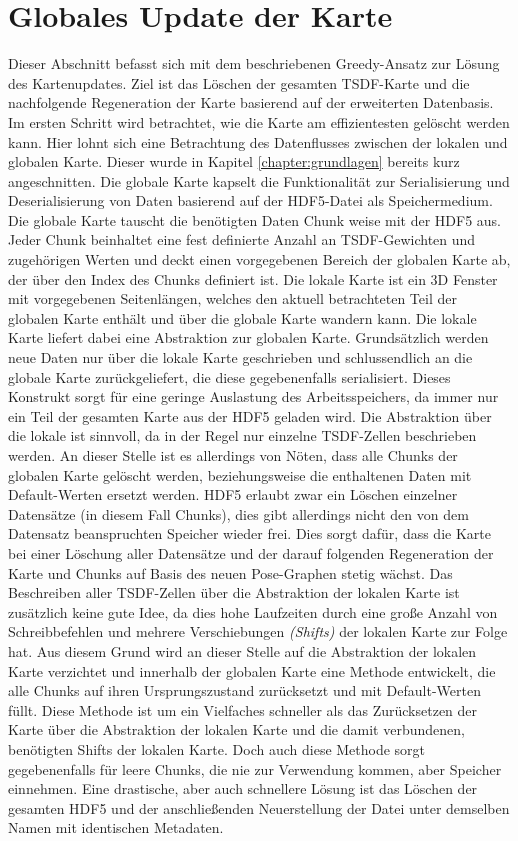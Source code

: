 \section{Globales Update der Karte}
\label{section:global_update}

Dieser Abschnitt befasst sich mit dem beschriebenen Greedy-Ansatz zur Lösung des Kartenupdates. Ziel ist das Löschen der gesamten TSDF-Karte und die nachfolgende Regeneration der Karte basierend auf der erweiterten Datenbasis. Im ersten Schritt wird betrachtet, wie die Karte am effizientesten gelöscht werden kann. Hier lohnt sich eine Betrachtung des Datenflusses zwischen der lokalen und globalen Karte. Dieser wurde in Kapitel \ref{chapter:grundlagen} bereits kurz angeschnitten. Die globale Karte kapselt die Funktionalität zur Serialisierung und Deserialisierung von Daten basierend auf der HDF5-Datei als Speichermedium. Die globale Karte tauscht die benötigten Daten Chunk weise mit der HDF5 aus. Jeder Chunk beinhaltet eine fest definierte Anzahl an TSDF-Gewichten und zugehörigen Werten und deckt einen vorgegebenen Bereich der globalen Karte ab, der über den Index des Chunks definiert ist. Die lokale Karte ist ein 3D Fenster mit vorgegebenen Seitenlängen, welches den aktuell betrachteten Teil der globalen Karte enthält und über die globale Karte wandern kann. Die lokale Karte liefert dabei eine Abstraktion zur globalen Karte. Grundsätzlich werden neue Daten nur über die lokale Karte geschrieben und schlussendlich an die globale Karte zurückgeliefert, die diese gegebenenfalls serialisiert. Dieses Konstrukt sorgt für eine geringe Auslastung des Arbeitsspeichers, da immer nur ein Teil der gesamten Karte aus der HDF5 geladen wird. Die Abstraktion über die lokale ist sinnvoll, da in der Regel nur einzelne TSDF-Zellen beschrieben werden. An dieser Stelle ist es allerdings von Nöten, dass alle Chunks der globalen Karte gelöscht werden, beziehungsweise die enthaltenen Daten mit Default-Werten ersetzt werden. HDF5 erlaubt zwar ein Löschen einzelner Datensätze (in diesem Fall Chunks), dies gibt allerdings nicht den von dem Datensatz beanspruchten Speicher wieder frei. Dies sorgt dafür, dass die Karte bei einer Löschung aller Datensätze und der darauf folgenden Regeneration der Karte und Chunks auf Basis des neuen Pose-Graphen stetig wächst. Das Beschreiben aller TSDF-Zellen über die Abstraktion der lokalen Karte ist zusätzlich keine gute Idee, da dies hohe Laufzeiten durch eine große Anzahl von Schreibbefehlen und mehrere Verschiebungen \emph{(Shifts)} der lokalen Karte zur Folge hat. Aus diesem Grund wird an dieser Stelle auf die Abstraktion der lokalen Karte verzichtet und innerhalb der globalen Karte eine Methode entwickelt, die alle Chunks auf ihren Ursprungszustand zurücksetzt und mit Default-Werten füllt. Diese Methode ist um ein Vielfaches schneller als das Zurücksetzen der Karte über die Abstraktion der lokalen Karte und die damit verbundenen, benötigten Shifts der lokalen Karte. Doch auch diese Methode sorgt gegebenenfalls für leere Chunks, die nie zur Verwendung kommen, aber Speicher einnehmen. Eine drastische, aber auch schnellere Lösung ist das Löschen der gesamten HDF5 und der anschließenden Neuerstellung der Datei unter demselben Namen mit identischen Metadaten.

